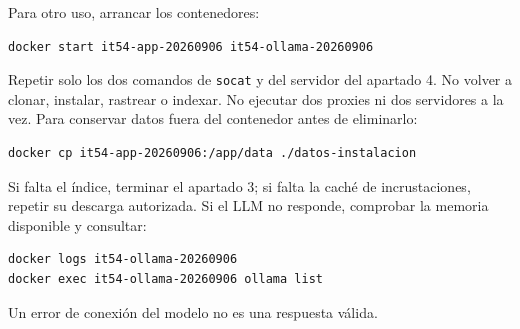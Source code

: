 Para otro uso, arrancar los contenedores:

\begingroup\footnotesize\begin{verbatim}
docker start it54-app-20260906 it54-ollama-20260906
\end{verbatim}\endgroup

Repetir
solo los dos comandos de \texttt{socat} y del servidor del apartado 4. No volver a
clonar, instalar, rastrear o indexar. No ejecutar dos proxies ni dos servidores
a la vez. Para conservar datos fuera del contenedor antes de eliminarlo:

\begingroup\footnotesize\begin{verbatim}
docker cp it54-app-20260906:/app/data ./datos-instalacion
\end{verbatim}\endgroup

Si falta el índice, terminar el apartado 3; si falta la caché de
incrustaciones, repetir su descarga autorizada. Si el LLM no responde,
comprobar la memoria disponible y consultar:

\begingroup\footnotesize\begin{verbatim}
docker logs it54-ollama-20260906
docker exec it54-ollama-20260906 ollama list
\end{verbatim}\endgroup

Un error de conexión del modelo no es una respuesta válida.
